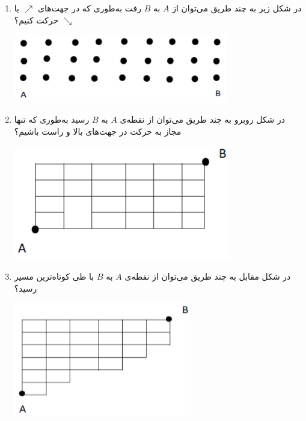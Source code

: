 \EXERCISE
\begin{enumerate}
\item
در شکل زیر به چند طریق می‌توان از
$A$
به
$B$
رفت به‌طوری که در جهت‌های
$\nearrow$
یا
$\searrow$
حرکت کنیم؟
\begin{center}
\includegraphics[height=3cm]{21.png}
\end{center}
\item
در شکل روبرو به چند طریق می‌توان از نقطه‌ی
$A$
به
$B$
رسید به‌طوری که تنها مجاز به حرکت در جهت‌های بالا و راست باشیم؟
\begin{center}
\includegraphics[height=5cm]{22.png}
\end{center}
\item
در شکل مقابل به چند طریق می‌توان از نقطه‌ی
$A$
به
$B$
با طی کوتاه‌ترین مسیر رسید؟
\begin{center}
\includegraphics[height=5cm]{23.png}
\end{center}
\end{enumerate}